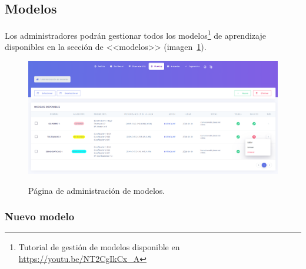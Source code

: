 \subsection{Modelos}
\label{s-e:models}

Los administradores podrán gestionar todos los modelos\footnote{Tutorial de gestión de modelos disponible en \url{https://youtu.be/NT2CgIkCx_A}} de aprendizaje disponibles en la sección de <<modelos>> (imagen~\ref{e-5:models}).

\begin{figure}[h]
	\caption[Manual de usuario: página de modelos]{Página de administración de modelos.}
	\centering
	\includegraphics[width=\textwidth]{../img/anexos/user_guide/5_models}
	\label{e-5:models}
\end{figure}

\subsubsection{Nuevo modelo}
\label{s-e:nuevo-modelo}

